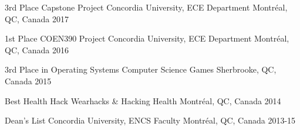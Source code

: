 



\begin{cvhonors}

  \cvhonor
    {3rd Place Capstone Project} %
    {Concordia University, ECE Department} %
    {Montréal, QC, Canada} %
    {2017} %

  \cvhonor
    {1st Place COEN390 Project} %
    {Concordia University, ECE Department} %
    {Montréal, QC, Canada} %
    {2016} %

  \cvhonor
    {3rd Place in Operating Systems} %
    {Computer Science Games} %
    {Sherbrooke, QC, Canada} %
    {2015} %

  \cvhonor
    {Best Health Hack} %
    {Wearhacks \& Hacking Health} %
    {Montréal, QC, Canada} %
    {2014} %
    
  \cvhonor	
    {Dean's List} %
    {Concordia University, ENCS Faculty} %
    {Montréal, QC, Canada} %
    {2013-15} %







\end{cvhonors}
